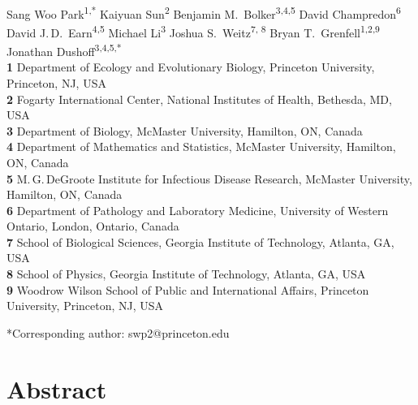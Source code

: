 \documentclass[12pt]{article}
\date{\today}
\begin{document}
\begin{flushleft}{
	\Large
	\textbf{}
}
\newline
\\
Sang Woo Park\textsuperscript{1,*}
Kaiyuan Sun\textsuperscript{2}
Benjamin M.\ Bolker\textsuperscript{3,4,5}
David Champredon\textsuperscript{6}
David J.\,D.\ Earn\textsuperscript{4,5}
Michael Li\textsuperscript{3}
Joshua S.\ Weitz\textsuperscript{7, 8}
Bryan T.\ Grenfell\textsuperscript{1,2,9}
Jonathan Dushoff\textsuperscript{3,4,5,*}
\\
\bigskip
\textbf{1} Department of Ecology and Evolutionary Biology, Princeton University, Princeton, NJ, USA
\\
\textbf{2} Fogarty International Center, National Institutes of Health, Bethesda, MD, USA
\\
\textbf{3} Department of Biology, McMaster University, Hamilton, ON, Canada
\\
\textbf{4} Department of Mathematics and Statistics, McMaster University, Hamilton, ON, Canada
\\
\textbf{5} M.\,G.\,DeGroote Institute for Infectious Disease Research, McMaster University, Hamilton, ON, Canada
\\
\textbf{6} Department of Pathology and Laboratory Medicine, University of Western Ontario, London, Ontario, Canada
\\
\textbf{7} School of Biological Sciences, Georgia Institute of Technology, Atlanta, GA, USA
\\
\textbf{8} School of Physics, Georgia Institute of Technology, Atlanta, GA, USA
\\
\textbf{9} Woodrow Wilson School of Public and International Affairs, Princeton University, Princeton, NJ, USA
\\
\bigskip

*Corresponding author: swp2@princeton.edu
\end{flushleft}

\section*{Abstract}
\end{document}
